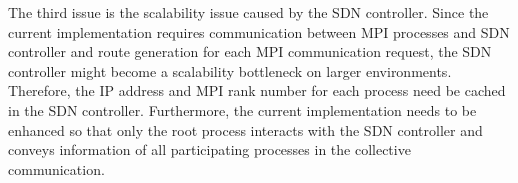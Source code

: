 The third issue is the scalability issue caused by the SDN controller.
Since the current implementation requires communication between MPI processes
and SDN controller and route generation for each MPI communication request,
the SDN controller might become a scalability bottleneck on larger
environments. Therefore, the IP address and MPI rank number for each process
need be cached in the SDN controller. Furthermore, the current implementation
needs to be enhanced so that only the root process interacts with the SDN
controller and conveys information of all participating processes in the
collective communication.
